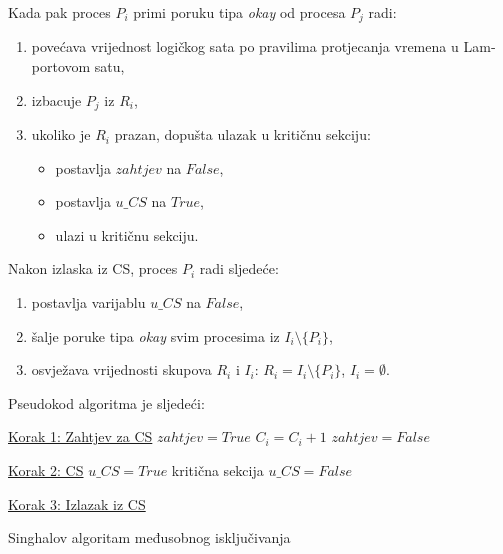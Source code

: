 \documentclass[12pt]{rectors}
\begin{document}
\begin{otherlanguage}{croatian}
Kada pak proces $P_i$ primi poruku tipa \textit{okay} od procesa $P_j$ radi:%
\begin{enumerate}
	\item povećava vrijednost logičkog sata po pravilima protjecanja vremena u Lamportovom satu,
	\item izbacuje $P_j$ iz $R_i$,
	\item ukoliko je $R_i$ prazan, dopušta ulazak u kritičnu sekciju:
	\begin{itemize}
		\item postavlja $zahtjev$ na $False$,
		\item postavlja $u\_CS$ na $True$,
		\item ulazi u kritičnu sekciju.
	\end{itemize} 
\end{enumerate}
Nakon izlaska iz CS, proces $P_i$ radi sljedeće:%
\begin{enumerate}
	\item postavlja varijablu $u\_CS$ na $False$,
	\item šalje poruke tipa \textit{okay} svim procesima iz $I_i \setminus \{P_i\}$, 
	\item osvježava vrijednosti skupova $R_i$ i $I_i$:  $R_i = I_i \setminus \{P_i\}$, $I_i = \emptyset$.
\end{enumerate} 
\newpage
Pseudokod algoritma je sljedeći:\\
\begin{algorithm}[H]
	
	\underline{Korak 1: Zahtjev za CS}\;
	$zahtjev = True$\;
	$C_i = C_i +1$\;
	$zahtjev = False$\;	
	
	\underline{Korak 2: CS}\;
	$u\_CS = True$\;
	kritična sekcija\;
	$u\_CS = False$\;
	
	\underline{Korak 3: Izlazak iz CS}\;
	
	\caption{Singhalov algoritam međusobnog isključivanja}
\end{algorithm} 
\vspace{0.2cm}


\end{otherlanguage}
\end{document}

